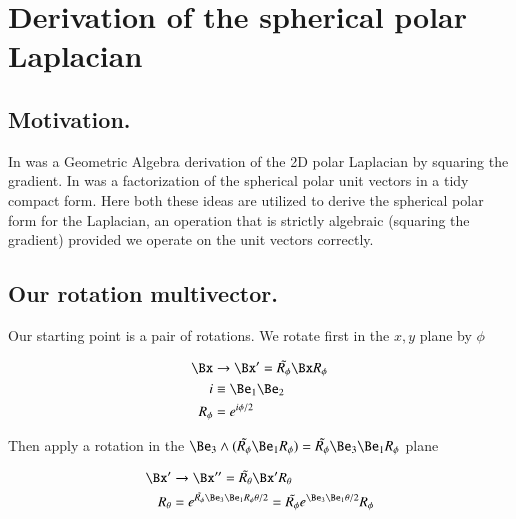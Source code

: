 %
%

\chapter{Derivation of the spherical polar Laplacian}
\label{chap:sphericalPolarLaplacian}
{}
\date{Oct 20, 2010}

\beginArtWithToc

\section{Motivation.}

In  was a Geometric Algebra derivation of the 2D polar Laplacian by squaring the gradient.  In  was a factorization of the spherical polar unit vectors in a tidy compact form.  Here both these ideas are utilized to derive the spherical polar form for the Laplacian, an operation that is strictly algebraic (squaring the gradient) provided we operate on the unit vectors correctly.

\section{Our rotation multivector.}

Our starting point is a pair of rotations.  We rotate first in the $x,y$ plane by $\phi$

\begin{subequations}
\label{eqn:sphericalPolarLaplacian:101}
\begin{align}
\Bx &\rightarrow \Bx' = \tilde{R_\phi} \Bx R_\phi \\
i &\equiv \Be_1 \Be_2 \\
R_\phi &= e^{i \phi/2}
\end{align}
\end{subequations}

Then apply a rotation in the $\Be_3 \wedge (\tilde{R_\phi} \Be_1 R_\phi) = \tilde{R_\phi} \Be_3 \Be_1 R_\phi$ plane

\begin{subequations}
\label{eqn:sphericalPolarLaplacian:102}
\begin{align}
\Bx' &\rightarrow \Bx'' = \tilde{R_\theta} \Bx' R_\theta \\
R_\theta &= e^{ \tilde{R_\phi} \Be_3 \Be_1 R_\phi \theta/2 } = \tilde{R_\phi} e^{ \Be_3 \Be_1 \theta/2 } R_\phi
\end{align}
\end{subequations}

